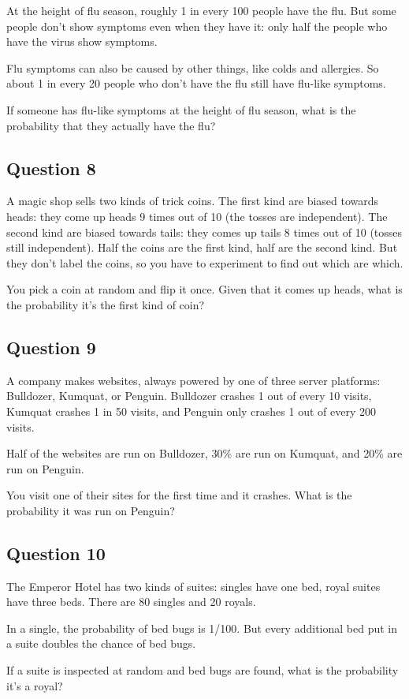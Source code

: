 \documentclass[11pt,]{article}
\begin{document}
At the height of flu season, roughly 1 in every 100 people have the flu.
But some people don't show symptoms even when they have it: only half
the people who have the virus show symptoms.

Flu symptoms can also be caused by other things, like colds and
allergies. So about 1 in every 20 people who don't have the flu still
have flu-like symptoms.

If someone has flu-like symptoms at the height of flu season, what is
the probability that they actually have the flu?

\hypertarget{question-8}{%
\subsection{Question 8}\label{question-8}}

A magic shop sells two kinds of trick coins. The first kind are biased
towards heads: they come up heads 9 times out of 10 (the tosses are
independent). The second kind are biased towards tails: they comes up
tails 8 times out of 10 (tosses still independent). Half the coins are
the first kind, half are the second kind. But they don't label the
coins, so you have to experiment to find out which are which.

You pick a coin at random and flip it once. Given that it comes up
heads, what is the probability it's the first kind of coin?

\hypertarget{question-9}{%
\subsection{Question 9}\label{question-9}}

A company makes websites, always powered by one of three server
platforms: Bulldozer, Kumquat, or Penguin. Bulldozer crashes 1 out of
every 10 visits, Kumquat crashes 1 in 50 visits, and Penguin only
crashes 1 out of every 200 visits.

Half of the websites are run on Bulldozer, 30\% are run on Kumquat, and
20\% are run on Penguin.

You visit one of their sites for the first time and it crashes. What is
the probability it was run on Penguin?

\hypertarget{question-10}{%
\subsection{Question 10}\label{question-10}}

The Emperor Hotel has two kinds of suites: singles have one bed, royal
suites have three beds. There are 80 singles and 20 royals.

In a single, the probability of bed bugs is 1/100. But every additional
bed put in a suite doubles the chance of bed bugs.

If a suite is inspected at random and bed bugs are found, what is the
probability it's a royal?
\end{document}
